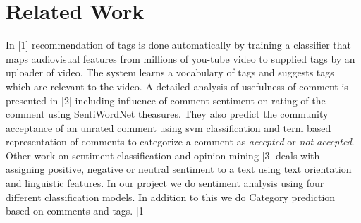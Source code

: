 \section{Related Work}
\label{sec:rel}
In [1] recommendation of tags is done automatically by training a classifier that maps audiovisual features from millions of you-tube video to supplied tags by an uploader of video. The system learns a vocabulary of tags and suggests tags which are relevant to the video. A detailed analysis of usefulness of comment is presented in [2] including influence of comment sentiment on rating of the comment using SentiWordNet theasures. They also predict the community acceptance of an unrated comment using svm classification and term based representation  of comments to categorize a comment as \textit{accepted} or \textit{not accepted}. Other work on sentiment classification and opinion mining [3] deals with assigning positive, negative or neutral sentiment to a text using text orientation and linguistic features. 
In our project we do sentiment analysis using four different classification models. In addition to this we do Category prediction based on comments and tags.
[1]